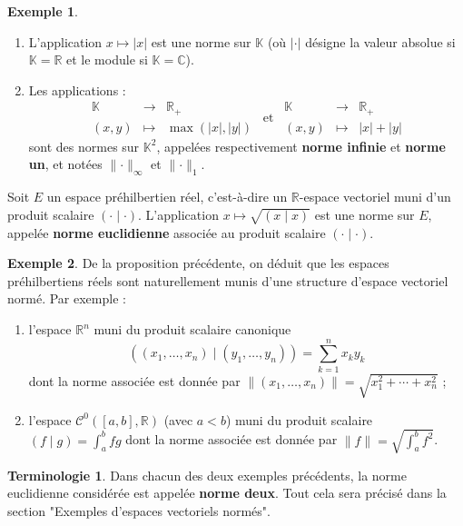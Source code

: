 \documentclass[french]{article}
\newcommand{\R}{\mathbb{R}}
\newcommand{\C}{\mathbb{C}}
\newcommand{\K}{\mathbb{K}}
\theoremstyle{plain}
\theoremstyle{definition}
\newtheorem*{ex}{Exemple}
\newtheorem*{terminologie}{Terminologie}
\theoremstyle{remark}
\begin{document}
\begin{ex}
	\begin{enumerate}
		\item L'application $x\mapsto\lvert x\rvert$ est une norme sur $\K$ (où $\lvert\cdot\rvert$ désigne la valeur absolue si $\K=\R$ et le module si $\K=\C$).
		\item Les applications : $$\begin{array}{rcl}
			\K&\longrightarrow&\R_+\\
			(x,y)&\longmapsto&\max(\lvert x\rvert,\lvert y\rvert)
		\end{array}\ \ \text{et}\ \ 
		\begin{array}{rcl}
			\K&\longrightarrow&\R_+\\
			(x,y)&\longmapsto&\lvert x\rvert+\lvert y\rvert
		\end{array}$$ sont des normes sur $\K^2$, appelées respectivement \textbf{norme infinie} et \textbf{norme un}, et notées $\lVert\cdot\rVert_\infty$ et $\lVert\cdot\rVert_1$.
	\end{enumerate}
\end{ex}

\begin{prop}
	Soit $E$ un espace préhilbertien réel, c'est-à-dire un $\R$-espace vectoriel muni d'un produit scalaire $(\cdot\mid\cdot)$. L'application $x\mapsto\sqrt{(x\mid x)}$ est une norme sur $E$, appelée \textbf{norme euclidienne} associée au produit scalaire $(\cdot\mid\cdot)$.
\end{prop}

\begin{ex}
	De la proposition précédente, on déduit que les espaces préhilbertiens réels sont naturellement munis d'une structure d'espace vectoriel normé. Par exemple :
	\begin{enumerate}
		\item l'espace $\R^n$ muni du produit scalaire canonique $$\left((x_1,\ldots,x_n)\mid(y_1,\ldots,y_n)\right)=\sum_{k=1}^{n}x_ky_k$$ dont la norme associée est donnée par $\lVert(x_1,\ldots,x_n)\rVert=\sqrt{x_1^2+\cdots+x_n^2}$ ;
		\item l'espace $\mathcal{C}^0([a,b],\R)$ (avec $a<b$) muni du produit scalaire $(f\mid g)=\displaystyle\int_{a}^{b}fg$ dont la norme associée est donnée par $\lVert f\rVert=\displaystyle\sqrt{\int_{a}^{b}f^2}$.
	\end{enumerate}
\end{ex}

\begin{terminologie}
	Dans chacun des deux exemples précédents, la norme euclidienne considérée est appelée \textbf{norme deux}. Tout cela sera précisé dans la section "Exemples d'espaces vectoriels normés".
\end{terminologie}
\end{document}
